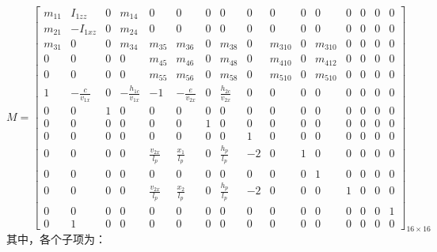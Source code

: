         \begin{equation}
        M = \begin{bmatrix}
        m_{11} & I_{1zz} & 0 & m_{14} & 0 & 0 & 0 & 0 & 0 & 0 & 0 & 0 & 0 & 0 & 0 & 0 \\
        m_{21} & -I_{1xz} & 0 & m_{24} & 0 & 0 & 0 & 0 & 0 & 0 & 0 & 0 & 0 & 0 & 0 & 0 \\
        m_{31} & 0 & 0 & m_{34} & m_{35} & m_{36} & 0 & m_{38} & 0 & m_{310} & 0 & m_{310} & 0 & 0 & 0 & 0 \\
        0 & 0 & 0 & 0 & m_{45} & m_{46} & 0 & m_{48} & 0 & m_{410} & 0 & m_{412} & 0 & 0 & 0 & 0 \\
        0 & 0 & 0 & 0 & m_{55} & m_{56} & 0 & m_{58} & 0 & m_{510} & 0 & m_{510} & 0 & 0 & 0 & 0 \\
        1 & -\frac{c}{v_{1x}} & 0 & -\frac{h_{1c}}{v_{1x}} & -1 & -\frac{e}{v_{2x}} & 0 & \frac{h_{2c}}{v_{2x}} & 0 & 0 & 0 & 0 & 0 & 0 & 0 & 0 \\
        0 & 0 & 1 & 0 & 0 & 0 & 0 & 0 & 0 & 0 & 0 & 0 & 0 & 0 & 0 & 0 \\
        0 & 0 & 0 & 0 & 0 & 0 & 1 & 0 & 0 & 0 & 0 & 0 & 0 & 0 & 0 & 0 \\
        0 & 0 & 0 & 0 & 0 & 0 & 0 & 0 & 1 & 0 & 0 & 0 & 0 & 0 & 0 & 0 \\
        0 & 0 & 0 & 0 & \frac{v_{2x}}{l_p} & \frac{x_1}{l_p} & 0 & \frac{h_p}{l_p} & -2 & 0 & 1 & 0 & 0 & 0 & 0 & 0 \\
        0 & 0 & 0 & 0 & 0 & 0 & 0 & 0 & 0 & 0 & 0 & 1 & 0 & 0 & 0 & 0 \\
        0 & 0 & 0 & 0 & \frac{v_{2x}}{l_p} & \frac{x_2}{l_p} & 0 & \frac{h_p}{l_p} & -2 & 0 & 0 & 0 & 1 & 0 & 0 & 0 \\
        0 & 0 & 0 & 0 & 0 & 0 & 0 & 0 & 0 & 0 & 0 & 0 & 0 & 0 & 0 & 1 \\
        0 & 1 & 0 & 0 & 0 & 0 & 0 & 0 & 0 & 0 & 0 & 0 & 0 & 0 & 0 & 0
        \end{bmatrix}_{16 \times 16}
        \label{eq:M}
        \end{equation}
        \noindent 其中，各个子项为：
